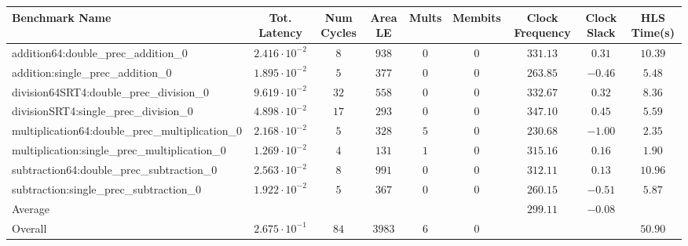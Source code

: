 \begin{tabular}{|l|c|c|c|c|c|c|c|c|}
\hline
Benchmark Name                                   & Tot. Latency            & Num Cycles & Area LE  & Mults & Membits & Clock Frequency & Clock Slack & HLS Time(s) \\
\hline
addition64:double\_prec\_addition\_0             & $ 2.416 \cdot 10^{-2} $ & $ 8      $ & $ 938  $ & $ 0 $ & $ 0   $ & $ 331.13      $ & $ 0.31    $ & $ 10.39   $ \\
addition:single\_prec\_addition\_0               & $ 1.895 \cdot 10^{-2} $ & $ 5      $ & $ 377  $ & $ 0 $ & $ 0   $ & $ 263.85      $ & $ -0.46   $ & $ 5.48    $ \\
division64SRT4:double\_prec\_division\_0         & $ 9.619 \cdot 10^{-2} $ & $ 32     $ & $ 558  $ & $ 0 $ & $ 0   $ & $ 332.67      $ & $ 0.32    $ & $ 8.36    $ \\
divisionSRT4:single\_prec\_division\_0           & $ 4.898 \cdot 10^{-2} $ & $ 17     $ & $ 293  $ & $ 0 $ & $ 0   $ & $ 347.10      $ & $ 0.45    $ & $ 5.59    $ \\
multiplication64:double\_prec\_multiplication\_0 & $ 2.168 \cdot 10^{-2} $ & $ 5      $ & $ 328  $ & $ 5 $ & $ 0   $ & $ 230.68      $ & $ -1.00   $ & $ 2.35    $ \\
multiplication:single\_prec\_multiplication\_0   & $ 1.269 \cdot 10^{-2} $ & $ 4      $ & $ 131  $ & $ 1 $ & $ 0   $ & $ 315.16      $ & $ 0.16    $ & $ 1.90    $ \\
subtraction64:double\_prec\_subtraction\_0       & $ 2.563 \cdot 10^{-2} $ & $ 8      $ & $ 991  $ & $ 0 $ & $ 0   $ & $ 312.11      $ & $ 0.13    $ & $ 10.96   $ \\
subtraction:single\_prec\_subtraction\_0         & $ 1.922 \cdot 10^{-2} $ & $ 5      $ & $ 367  $ & $ 0 $ & $ 0   $ & $ 260.15      $ & $ -0.51   $ & $ 5.87    $ \\
\hline
Average                                          & $                     $ & $        $ & $      $ & $   $ & $     $ & $ 299.11      $ & $ -0.08   $ & $         $ \\
\hline
Overall                                          & $ 2.675 \cdot 10^{-1} $ & $ 84     $ & $ 3983 $ & $ 6 $ & $ 0   $ & $             $ & $         $ & $ 50.90   $ \\
\hline
\end{tabular}

